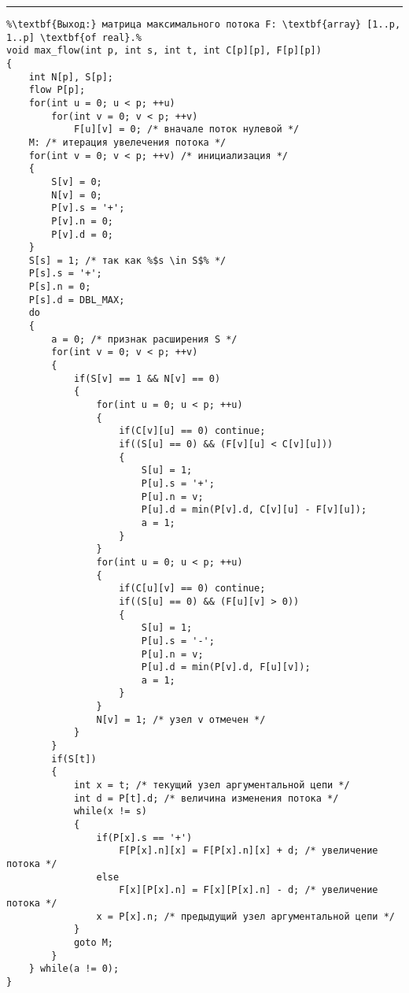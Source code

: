 \documentclass{article}
\begin{document}
\vspace{5pt} \hrule
\begin{lstlisting}[caption={Нахождение максимального потока}, label=p279_max_flow, escapechar=\%]
%\noindent\textbf{Вход:} сеть G(V, E) с источником s и стоком t, заданная матрицей пропускных способностей C: \textbf{array} [1..p, 1..p] \textbf{of real}.\\%
%\textbf{Выход:} матрица максимального потока F: \textbf{array} [1..p, 1..p] \textbf{of real}.%
void max_flow(int p, int s, int t, int C[p][p], F[p][p])
{
	int N[p], S[p];
	flow P[p];
	for(int u = 0; u < p; ++u)
		for(int v = 0; v < p; ++v)
			F[u][v] = 0; /* вначале поток нулевой */
	M: /* итерация увелечения потока */
	for(int v = 0; v < p; ++v) /* инициализация */
	{
		S[v] = 0;
		N[v] = 0;
		P[v].s = '+';
		P[v].n = 0;
		P[v].d = 0;
	}
	S[s] = 1; /* так как %$s \in S$% */
	P[s].s = '+';
	P[s].n = 0;
	P[s].d = DBL_MAX;
	do
	{
		a = 0; /* признак расширения S */
		for(int v = 0; v < p; ++v)
		{
			if(S[v] == 1 && N[v] == 0)
			{
				for(int u = 0; u < p; ++u)
				{
					if(C[v][u] == 0) continue;
					if((S[u] == 0) && (F[v][u] < C[v][u]))
	  				{
						S[u] = 1;
						P[u].s = '+';
						P[u].n = v;
						P[u].d = min(P[v].d, C[v][u] - F[v][u]);
						a = 1;
					}
				}
				for(int u = 0; u < p; ++u)
				{
					if(C[u][v] == 0) continue;
					if((S[u] == 0) && (F[u][v] > 0))
					{
						S[u] = 1;
						P[u].s = '-';
						P[u].n = v;
						P[u].d = min(P[v].d, F[u][v]);
						a = 1;
					}
				}
				N[v] = 1; /* узел v отмечен */
			}
		}
		if(S[t])
		{
			int x = t; /* текущий узел аргументальной цепи */
			int d = P[t].d; /* величина изменения потока */
			while(x != s)
			{
				if(P[x].s == '+')
					F[P[x].n][x] = F[P[x].n][x] + d; /* увеличение потока */
				else
					F[x][P[x].n] = F[x][P[x].n] - d; /* увеличение потока */
				x = P[x].n; /* предыдущий узел аргументальной цепи */
			}
			goto M;
		}
	} while(a != 0);
}
\end{lstlisting}
\end{document}
